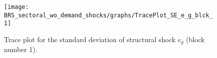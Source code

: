 \begin{figure}[H]
\centering
  \texttt{[image: BRS\_sectoral\_wo\_demand\_shocks/graphs/TracePlot\_SE\_e\_g\_blck\_1]}\\
    \caption{Trace plot for the standard deviation of structural shock ${e_g}$ (block number 1).}
\end{figure}
